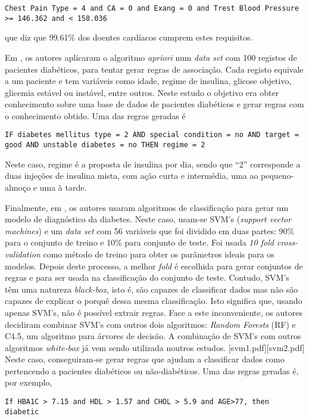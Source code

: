 \begin{lstlisting}
Chest Pain Type = 4 and CA = 0 and Exang = 0 and Trest Blood Pressure >= 146.362 and < 158.036
\end{lstlisting}
que diz que 99.61\% dos doentes cardíacos cumprem estes requisitos. 

Em \cite{association}, os autores aplicaram o algoritmo \textit{apriori} num \textit{data set} com 100 registos de pacientes diabéticos, para tentar gerar regras de associação. Cada registo equivale a um paciente e tem variáveis como idade, regime de insulina, glicose objetivo, glicemia estável ou instável, entre outros. 
Neste estudo o objetivo era obter conhecimento sobre uma base de dados de pacientes diabéticos e gerar regras com o conhecimento obtido.
Uma das regras geradas é 
\begin{lstlisting}
IF diabetes mellitus type = 2 AND special condition = no AND target = good AND unstable diabetes = no THEN regime = 2
\end{lstlisting}
Neste caso, regime é a proposta de insulina por dia, sendo que ``2'' corresponde a duas injeções de insulina mista, com ação curta e intermédia, uma ao pequeno-almoço e uma à tarde. 

Finalmente, em \cite{svm}, os autores usaram algoritmos de classificação para gerar um modelo de diagnóstico da diabetes. Neste caso, usam-se SVM's (\textit{support vector machines}) e um \textit{data set} com 56 variáveis que foi dividido em duas partes: 90\% para o conjunto de treino e 10\% para conjunto de teste. Foi usada \textit{10 fold cross-validation} como método de treino para obter os parâmetros ideais para os modelos. Depois deste processo, a melhor \textit{fold} é escolhida para gerar conjuntos de regras e para ser usada na classificação do conjunto de teste. Contudo, SVM's têm uma natureza \textit{black-box}, isto é, 	são capazes de classificar dados mas não são capazes de explicar o porquê dessa mesma classificação. Isto significa que, usando apenas SVM's, não é possível extrair regras. Face a este inconveniente, os autores decidiram combinar SVM's com outros dois algoritmos: \textit{Random Forests} (RF) e C4.5, um algoritmo para árvores de decisão. A combinação de SVM's com outros algoritmos \textit{white-box} já vem sendo utilizada noutros estudos. [svm1.pdf][svm2.pdf] Neste caso, conseguiram-se gerar regras que ajudam a classificar dados como pertencendo a pacientes diabéticos ou não-diabéticos. Uma das regras geradas é, por exemplo, 
\begin{lstlisting}
If HBA1C > 7.15 and HDL > 1.57 and CHOL > 5.9 and AGE>77, then diabetic
\end{lstlisting}

